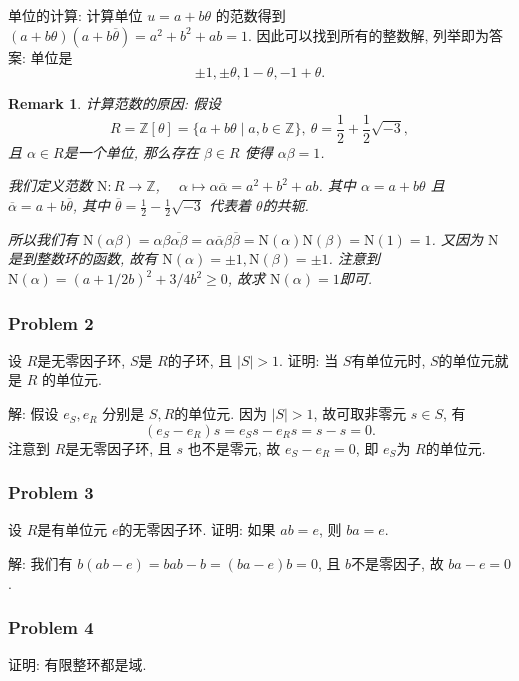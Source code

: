 \documentclass[a4paper,12pt]{ctexart}
\newcommand{\Z}{\mathbb{Z}}
\newtheorem{remark}{Remark}
\begin{document}
    单位的计算: 计算单位 $ u=a+b\theta $ 的范数得到 $ (a+b\theta)(a+b\overline{\theta})=a^2+b^2+ab=1 $.
    因此可以找到所有的整数解, 列举即为答案: 单位是
    \[\pm 1,\pm\theta,1-\theta,-1+\theta.\] 
\begin{remark}
  
  计算范数的原因: 
  假设 \[R=\Z[\theta]=\{a+b\theta\mid a,b\in\Z\},~\theta=\frac{1}{2}+\frac{1}{2}\sqrt{-3},\]
  且 $ \alpha\in R $是一个单位, 那么存在 $ \beta\in R $ 使得 $ \alpha\beta=1 $. 
  
  我们定义范数 $ \mathrm{N}: R\rightarrow\Z $,  ~~$ \alpha\mapsto \alpha\overline{\alpha}=a^{2}+b^{2}+ab $. 
  其中 $ \alpha=a+b\theta $ 且 $ \overline{\alpha}=a+b\overline{\theta} $, 
  其中 $ \overline{\theta}=\frac{1}{2}-\frac{1}{2}\sqrt{-3} $ 代表着 $ \theta $的共轭.
  
  所以我们有 $ \mathrm{N}(\alpha\beta)=\alpha\beta\overline{\alpha\beta}=\alpha\overline{\alpha}\beta\overline{\beta}=\mathrm{N}(\alpha)\mathrm{N}(\beta)=\mathrm{N}(1)=1  $. 
  又因为 $ \mathrm{N} $是到整数环的函数, 故有 $ \mathrm{N}(\alpha)=\pm 1,\mathrm{N}(\beta)=\pm 1 $. 
  注意到 $ \mathrm{N}(\alpha)=(a+1/2b)^2+3/4b^2\ge 0 $, 故求 $ \mathrm{N}(\alpha)=1 $即可.
\end{remark}
  
\subsubsection*{Problem 2} 
    设 $ R $是无零因子环, $ S $是 $ R $的子环, 且 $ |S|>1 $. 证明: 当 $ S $有单位元时, $ S $的单位元就是 $ R $
    的单位元.

    解: 假设 $ e_S,e_R $ 分别是 $ S,R $的单位元. 因为 $ |S|>1 $, 故可取非零元 $ s\in S $, 有
    \[(e_S-e_R)s=e_Ss-e_Rs=s-s=0.\]
    注意到 $ R $是无零因子环, 且 $ s $ 也不是零元, 故 $ e_S-e_R=0 $, 即 $ e_S $为 $ R $的单位元.
    
\subsubsection*{Problem 3}
    设 $ R $是有单位元 $ e $的无零因子环. 证明: 如果 $ ab=e $, 则 $ ba=e $.

    解: 我们有 $ b(ab-e)=bab-b=(ba-e)b=0 $, 且 $ b $不是零因子, 故 $ ba-e=0 $.

\subsubsection*{Problem 4}
    证明: 有限整环都是域.
\end{document}
